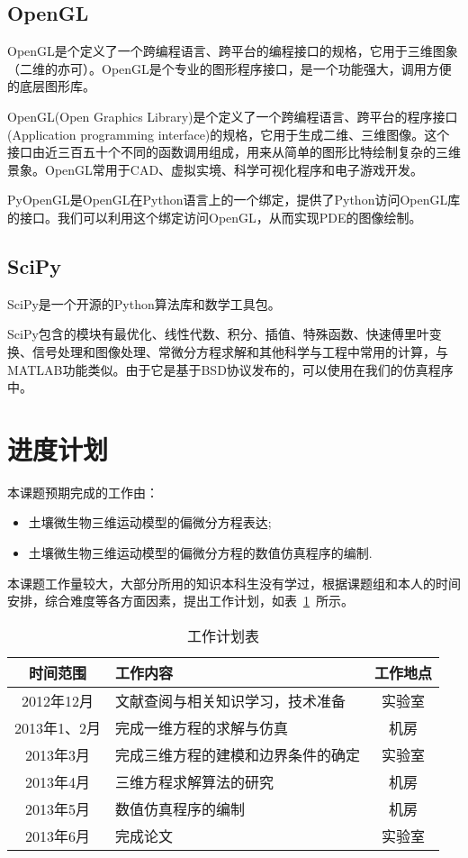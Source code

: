 \documentclass[a4paper,cs4size,adobefonts,fancyhdr]{ctexart}[2005/11/25]
\numberwithin{equation}{section} %
\begin{document}
\subsection{OpenGL}
OpenGL是个定义了一个跨编程语言、跨平台的编程接口的规格，它用于三维图象（二维的亦可）。OpenGL是个专业的图形程序接口，是一个功能强大，调用方便的底层图形库。\par
OpenGL(Open Graphics Library)是个定义了一个跨编程语言、跨平台的程序接口(Application programming interface)的规格，它用于生成二维、三维图像。这个接口由近三百五十个不同的函数调用组成，用来从简单的图形比特绘制复杂的三维景象。OpenGL常用于CAD、虚拟实境、科学可视化程序和电子游戏开发。\par
PyOpenGL是OpenGL在Python语言上的一个绑定，提供了Python访问OpenGL库的接口。我们可以利用这个绑定访问OpenGL，从而实现PDE的图像绘制。
\subsection{SciPy}
SciPy是一个开源的Python算法库和数学工具包。\par
SciPy包含的模块有最优化、线性代数、积分、插值、特殊函数、快速傅里叶变换、信号处理和图像处理、常微分方程求解和其他科学与工程中常用的计算，与MATLAB功能类似。由于它是基于BSD协议发布的，可以使用在我们的仿真程序中。
\section{进度计划}
本课题预期完成的工作由：
\begin{itemize}\setlength{\itemsep}{0em}
\item 土壤微生物三维运动模型的偏微分方程表达;
\item 土壤微生物三维运动模型的偏微分方程的数值仿真程序的编制.
\end{itemize}\par
本课题工作量较大，大部分所用的知识本科生没有学过，根据课题组和本人的时间安排，综合难度等各方面因素，提出工作计划，如表~\ref{tab:test}~所示。
\begin{table}[htbp]
\centering\caption{\label{tab:test}工作计划表}
\begin{tabularx}{14cm}{cXc}
\toprule
时间范围 & \centering 工作内容 & 工作地点 \\
\midrule
2012年12月 					& 文献查阅与相关知识学习，技术准备	&  实验室	\\
2013年1、2月			 		& 完成一维方程的求解与仿真			 &   机房\\
2013年3月					& 完成三维方程的建模和边界条件的确定   &   实验室		  \\
2013年4月					& 三维方程求解算法的研究				&	机房			  \\
2013年5月					& 数值仿真程序的编制				&	机房			  \\
2013年6月					& 完成论文						&   实验室		  \\
\bottomrule
\end{tabularx}
\end{table}
\newpage


\end{document}
